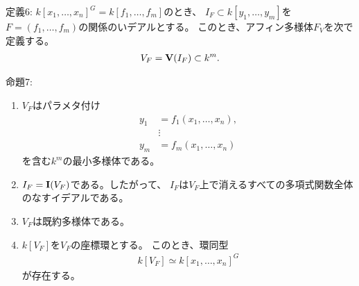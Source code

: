 \begin{framed}
  定義6:
  $k[x_1,\dots,x_n]^G = k[f_1,\dots,f_m]$のとき、
  $I_F \subset k[y_1,\dots,y_m]$を
  $F=(f_1,\dots,f_m)$の関係のいデアルとする。
  このとき、アフィン多様体$F_V$を次で定義する。
  \begin{align}
    V_F = \textbf V(I_F) \subset k^m.
  \end{align}
\end{framed}

\begin{framed}
  命題7:
  \begin{enumerate}[label=(\roman*)]
    \item $V_F$はパラメタ付け
    \begin{align}
      y_1 &= f_1(x_1,\dots,x_n),\\
      &\vdots \\
      y_m &= f_m(x_1,\dots,x_n)
    \end{align}
    を含む$k^m$の最小多様体である。
    \item
    $I_F = \textbf I(V_F)$である。したがって、
    $I_F$は$V_F$上で消えるすべての多項式関数全体のなすイデアルである。
    \item
    $V_F$は既約多様体である。
    \item
    $k[V_F]$を$V_F$の座標環とする。
    このとき、環同型
    \begin{align}
      k[V_F] \simeq k[x_1,\dots,x_n]^G
    \end{align}
    が存在する。
  \end{enumerate}
\end{framed}
